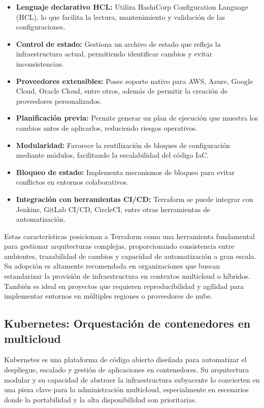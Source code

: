 {            \begin{itemize}
                \item \textbf{Lenguaje declarativo HCL:} Utiliza HashiCorp Configuration Language (HCL), lo que facilita la lectura, mantenimiento y validación de las configuraciones.
                \item \textbf{Control de estado:} Gestiona un archivo de estado que refleja la infraestructura actual, permitiendo identificar cambios y evitar inconsistencias.
                \item \textbf{Proveedores extensibles:} Posee soporte nativo para AWS, Azure, Google Cloud, Oracle Cloud, entre otros, además de permitir la creación de proveedores personalizados.
                \item \textbf{Planificación previa:} Permite generar un plan de ejecución que muestra los cambios antes de aplicarlos, reduciendo riesgos operativos.
                \item \textbf{Modularidad:} Favorece la reutilización de bloques de configuración mediante módulos, facilitando la escalabilidad del código IaC.
                \item \textbf{Bloqueo de estado:} Implementa mecanismos de bloqueo para evitar conflictos en entornos colaborativos.
                \item \textbf{Integración con herramientas CI/CD:} Terraform se puede integrar con Jenkins, GitLab CI/CD, CircleCI, entre otras herramientas de automatización.
            \end{itemize}
                
            Estas características posicionan a Terraform como una herramienta fundamental para gestionar arquitecturas complejas, proporcionando consistencia entre ambientes, trazabilidad de cambios y capacidad de automatización a gran escala. Su adopción es altamente recomendada en organizaciones que buscan estandarizar la provisión de infraestructura en contextos multicloud o híbridos. También es ideal en proyectos que requieren reproducibilidad y agilidad para implementar entornos en múltiples regiones o proveedores de nube.
                
        \subsection{Kubernetes: Orquestación de contenedores en multicloud}
            Kubernetes es una plataforma de código abierto diseñada para automatizar el despliegue, escalado y gestión de aplicaciones en contenedores. Su arquitectura modular y su capacidad de abstraer la infraestructura subyacente lo convierten en una pieza clave para la administración multicloud, especialmente en escenarios donde la portabilidad y la alta disponibilidad son prioritarias.
                
}
